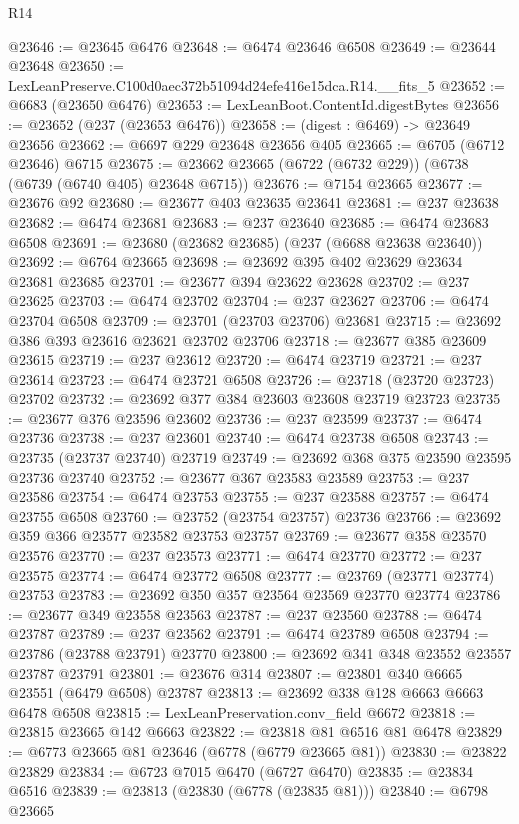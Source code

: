 \begin{lexlean}{R14}
\begin{coremodule}
@23646 := @23645 @6476
@23648 := @6474 @23646 @6508
@23649 := @23644 @23648
@23650 := LexLeanPreserve.C100d0aec372b51094d24efe416e15dca.R14.__fits_5
@23652 := @6683 (@23650 @6476)
@23653 := LexLeanBoot.ContentId.digestBytes
@23656 := @23652 (@237 (@23653 @6476))
@23658 := (digest : @6469) -> @23649 @23656
@23662 := @6697 @229 @23648 @23656 @405
@23665 := @6705 (@6712 @23646) @6715
@23675 := @23662 @23665 (@6722 (@6732 @229)) (@6738 (@6739 (@6740 @405) @23648 @6715))
@23676 := @7154 @23665
@23677 := @23676 @92
@23680 := @23677 @403 @23635 @23641
@23681 := @237 @23638
@23682 := @6474 @23681
@23683 := @237 @23640
@23685 := @6474 @23683 @6508
@23691 := @23680 (@23682 @23685) (@237 (@6688 @23638 @23640))
@23692 := @6764 @23665
@23698 := @23692 @395 @402 @23629 @23634 @23681 @23685
@23701 := @23677 @394 @23622 @23628
@23702 := @237 @23625
@23703 := @6474 @23702
@23704 := @237 @23627
@23706 := @6474 @23704 @6508
@23709 := @23701 (@23703 @23706) @23681
@23715 := @23692 @386 @393 @23616 @23621 @23702 @23706
@23718 := @23677 @385 @23609 @23615
@23719 := @237 @23612
@23720 := @6474 @23719
@23721 := @237 @23614
@23723 := @6474 @23721 @6508
@23726 := @23718 (@23720 @23723) @23702
@23732 := @23692 @377 @384 @23603 @23608 @23719 @23723
@23735 := @23677 @376 @23596 @23602
@23736 := @237 @23599
@23737 := @6474 @23736
@23738 := @237 @23601
@23740 := @6474 @23738 @6508
@23743 := @23735 (@23737 @23740) @23719
@23749 := @23692 @368 @375 @23590 @23595 @23736 @23740
@23752 := @23677 @367 @23583 @23589
@23753 := @237 @23586
@23754 := @6474 @23753
@23755 := @237 @23588
@23757 := @6474 @23755 @6508
@23760 := @23752 (@23754 @23757) @23736
@23766 := @23692 @359 @366 @23577 @23582 @23753 @23757
@23769 := @23677 @358 @23570 @23576
@23770 := @237 @23573
@23771 := @6474 @23770
@23772 := @237 @23575
@23774 := @6474 @23772 @6508
@23777 := @23769 (@23771 @23774) @23753
@23783 := @23692 @350 @357 @23564 @23569 @23770 @23774
@23786 := @23677 @349 @23558 @23563
@23787 := @237 @23560
@23788 := @6474 @23787
@23789 := @237 @23562
@23791 := @6474 @23789 @6508
@23794 := @23786 (@23788 @23791) @23770
@23800 := @23692 @341 @348 @23552 @23557 @23787 @23791
@23801 := @23676 @314
@23807 := @23801 @340 @6665 @23551 (@6479 @6508) @23787
@23813 := @23692 @338 @128 @6663 @6663 @6478 @6508
@23815 := LexLeanPreservation.conv_field @6672
@23818 := @23815 @23665 @142 @6663
@23822 := @23818 @81 @6516 @81 @6478
@23829 := @6773 @23665 @81 @23646 (@6778 (@6779 @23665 @81))
@23830 := @23822 @23829
@23834 := @6723 @7015 @6470 (@6727 @6470)
@23835 := @23834 @6516
@23839 := @23813 (@23830 (@6778 (@23835 @81)))
@23840 := @6798 @23665

\end{coremodule}
\end{lexlean}
